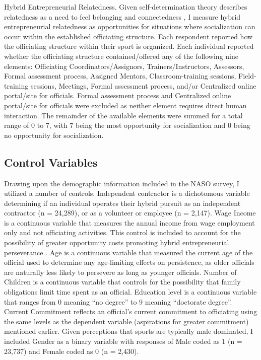\documentclass{article}
\begin{document}
Hybrid Entrepreneurial Relatedness. Given self-determination theory describes relatedness as a need to feel belonging and connectedness \cite{ryan2000self}, I measure hybrid entrepreneurial relatedness as opportunities for situations where socialization can occur within the established officiating structure.  Each respondent reported how the officiating structure within their sport is organized.  Each individual reported whether the officiating structure contained/offered any of the following nine elements: Officiating Coordinators/Assignors, Trainers/Instructors, Assessors, Formal assessment process, Assigned Mentors, Classroom-training sessions, Field-training sessions, Meetings, Formal assessment process, and/or Centralized online portal/site for officials. Formal assessment process and Centralized online portal/site for officials were excluded as neither element requires direct human interaction.  The remainder of the available elements were summed for a total range of 0 to 7, with 7 being the most opportunity for socialization and 0 being no opportunity for socialization. 

\subsection{Control Variables}
Drawing upon the demographic information included in the NASO survey, I utilized a number of controls. Independent contractor is a dichotomous variable determining if an individual operates their hybrid pursuit as an independent contractor (n = 24,289), or as a volunteer or employee (n = 2,147).  Wage Income is a continuous variable that measures the annual income from wage employment only and not officiating activities.  This control is included to account for the possibility of greater opportunity costs promoting hybrid entrepreneurial perseverance \cite{raffiee2014should, tong2020relative}.  Age is a continuous variable that measured the current age of the official used to determine any age-limiting effects on persistence, as older officials are naturally less likely to persevere as long as younger officials.  Number of Children is a continuous variable that controls for the possibility that family obligations limit time spent as an official.  Education level is a continuous variable that ranges from 0 meaning “no degree” to 9 meaning “doctorate degree”.  Current Commitment reflects an official’s current commitment to officiating using the same levels as the dependent variable (aspirations for greater commitment) mentioned earlier. Given perceptions that sports are typically male dominated, I included Gender as a binary variable with responses of Male coded as 1 (n = 23,737) and Female coded as 0 (n = 2,430).  
\end{document}
